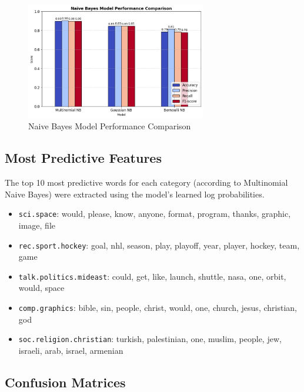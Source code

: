 \documentclass[a4paper,12pt]{article}
\begin{document}
\begin{figure}[H]
    \centering
    \includegraphics[width=0.7\textwidth]{Q2.png}
    \caption{Naive Bayes Model Performance Comparison}
\end{figure}

\subsection{Most Predictive Features}
The top 10 most predictive words for each category (according to Multinomial Naive Bayes) were extracted using the model's learned log probabilities.

\begin{itemize}
    \item \texttt{sci.space}: would, please, know, anyone, format, program, thanks, graphic, image, file
    \item \texttt{rec.sport.hockey}: goal, nhl, season, play, playoff, year, player, hockey, team, game
    \item \texttt{talk.politics.mideast}: could, get, like, launch, shuttle, nasa, one, orbit, would, space
    \item \texttt{comp.graphics}: bible, sin, people, christ, would, one, church, jesus, christian, god
    \item \texttt{soc.religion.christian}: turkish, palestinian, one, muslim, people, jew, israeli, arab, israel, armenian
\end{itemize}

\subsection{Confusion Matrices}
\end{document}
